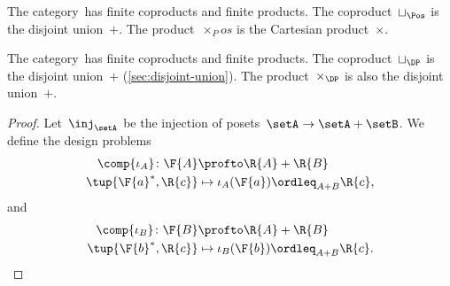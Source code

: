 \begin{example}
    The category~\Pos has finite coproducts and finite products.
    The coproduct~$\sqcup_\Pos$ is the disjoint union~$+$.
    The product~$\times_Pos$ is the Cartesian product~$\times$.
\end{example}

\begin{lemma}
    The category~\DP has finite coproducts and finite products.
    The coproduct~$\sqcup_\DP$ is the disjoint union~$+$ (\cref{sec:disjoint-union}).
    The product~$\times_\DP$ is also the disjoint union~$+$.
\end{lemma}

\begin{proof}
    Let~$\inj_\setA$ be the injection of posets~$\setA \to \setA+\setB$.
    We define the design problems
    \begin{equation}
        \begin{aligned}
            \comp{\iota_A} \colon \F{A} & \profto \R{A} + \R{B} \\
            \tup{\F{a}^*,\R{c}}         & \mapsto \iota_A(\F{a})\ordleq_{A+B}\R{c},
        \end{aligned}
    \end{equation}
    and
    \begin{equation}
        \begin{aligned}
            \comp{\iota_B} \colon \F{B} & \profto \R{A} + \R{B} \\
            \tup{\F{b}^*,\R{c}}         & \mapsto \iota_B(\F{b})\ordleq_{A+B}\R{c}.
        \end{aligned}
    \end{equation}


\end{proof}
